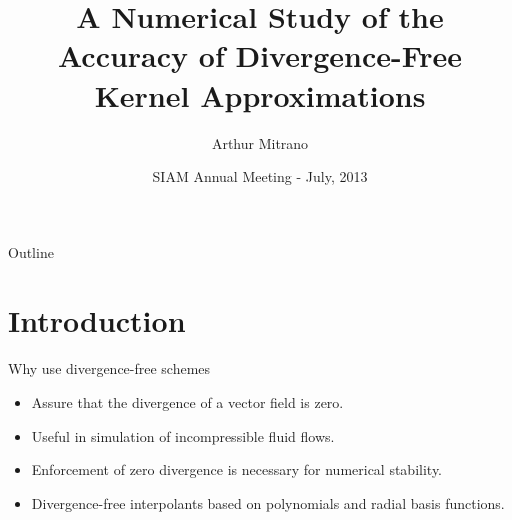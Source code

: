 \documentclass{beamer}
\title[]{A Numerical Study of the Accuracy of Divergence-Free Kernel Approximations}
\subtitle{}
\author[]
{Arthur Mitrano}
\institute[Arizona State University] %
{
  School of Mathematical and Statistical Sciences\\
  Arizona State University}
\date[AN13] %
{SIAM Annual Meeting - July, 2013}
\begin{document}
\begin{frame}
  \titlepage
\end{frame}

\begin{frame}{Outline}
  \tableofcontents
\end{frame}





\section{Introduction}
\begin{frame}{Why use divergence-free schemes}
  \begin{itemize}
    \item Assure that the divergence of a vector field is zero.

    \item Useful in simulation of incompressible fluid flows.

    \item Enforcement of zero divergence is necessary for numerical stability.

    \item Divergence-free interpolants based on polynomials and radial basis
      functions.
  \end{itemize}	
\end{frame}
\end{document}
